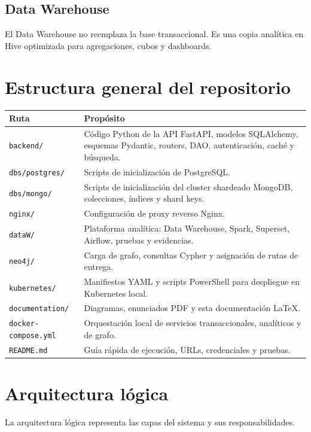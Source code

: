 \documentclass[12pt,letterpaper]{article}
\def\codefile#1{\nolinkurl{#1}}
\begin{document}
\subsection{Data Warehouse}

El Data Warehouse no reemplaza la base transaccional. Es una copia analítica en Hive optimizada para agregaciones, cubos y dashboards.

\section{Estructura general del repositorio}

\begin{longtable}{p{}p{}}
\toprule
\textbf{Ruta} & \textbf{Propósito}\\
\midrule
\codefile{backend/} & Código Python de la API FastAPI, modelos SQLAlchemy, esquemas Pydantic, routers, DAO, autenticación, caché y búsqueda.\\
\codefile{dbs/postgres/} & Scripts de inicialización de PostgreSQL.\\
\codefile{dbs/mongo/} & Scripts de inicialización del cluster shardeado MongoDB, colecciones, índices y shard keys.\\
\codefile{nginx/} & Configuración de proxy reverso Nginx.\\
\codefile{dataW/} & Plataforma analítica: Data Warehouse, Spark, Superset, Airflow, pruebas y evidencias.\\
\codefile{neo4j/} & Carga de grafo, consultas Cypher y asignación de rutas de entrega.\\
\codefile{kubernetes/} & Manifiestos YAML y scripts PowerShell para despliegue en Kubernetes local.\\
\codefile{documentation/} & Diagramas, enunciados PDF y esta documentación LaTeX.\\
\codefile{docker-compose.yml} & Orquestación local de servicios transaccionales, analíticos y de grafo.\\
\codefile{README.md} & Guía rápida de ejecución, URLs, credenciales y pruebas.\\
\bottomrule
\end{longtable}

\section{Arquitectura lógica}

La arquitectura lógica representa las capas del sistema y sus responsabilidades.
\end{document}

